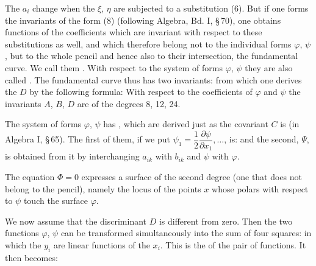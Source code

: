 
The $a_i$ change when the $\xi$, $\eta$ are subjected to a substitution
(6). But if one forms the invariants of the form (8) (following
Algebra, Bd. I, §\,70), one obtains functions of the coefficients
which are invariant with respect to these substitutions as well, and
which therefore belong not to the individual forms $\varphi$, $\psi$,
but to the whole pencil and hence also to their intersection, the
fundamental curve. We call them .
With respect to the system of forms $\varphi$, $\psi$ they are also
called . The fundamental curve thus has two invariants:
from which one derives the  $D$ by the following formula:
With respect to the coefficients of $\varphi$ and $\psi$ the
invariants $A$, $B$, $D$ are of the degrees 8, 12, 24.

The system of forms $\varphi$, $\psi$ has , which are derived just as the covariant $C$ is (in Algebra I,
§\,65). The first of them, if we put
$\psi_1 = \dfrac{1}{2}\dfrac{\partial \psi}{\partial x_1}, \dots$,
is:
and the second, $\Psi$, is obtained from it by interchanging $a_{ik}$
with $b_{ik}$ and $\psi$ with $\varphi$.

The equation $\Phi = 0$ expresses a surface of the second degree (one
that does not belong to the pencil), namely the locus of the points $x$
whose polars with respect to $\psi$ touch the surface $\varphi$.

We now assume that the discriminant $D$ is different from zero. Then
the two functions $\varphi$, $\psi$ can be transformed simultaneously
into the sum of four squares:
in which the $y_i$ are linear functions of the $x_i$. This is the
 of the pair of functions. It then becomes:
